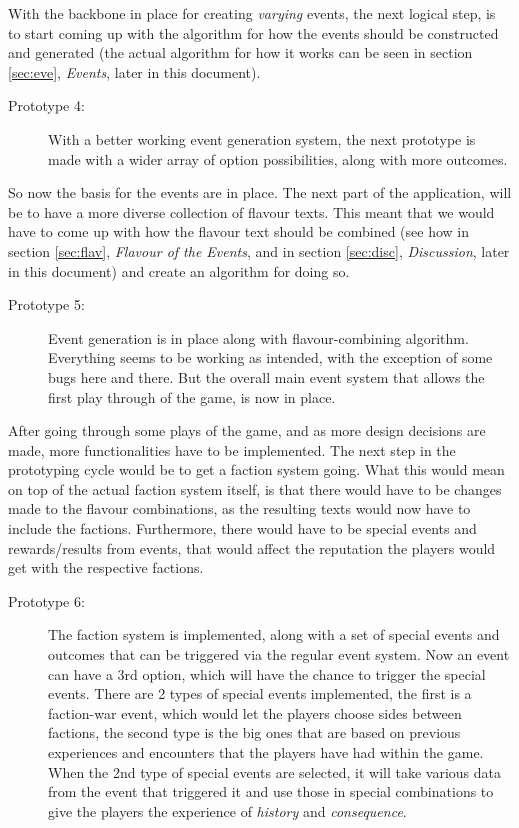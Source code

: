 With the backbone in place for creating \textit{varying} events, the next logical step, is to start coming up with the algorithm for how the events should be constructed and generated (the actual algorithm for how it works can be seen in section \ref{sec:eve}, \textit{Events}, later in this document).

\begin{description}
\item[Prototype 4:] With a better working event generation system, the next prototype is made with a wider array of option possibilities, along with more outcomes.
\end{description}

So now the basis for the events are in place. The next part of the application, will be to have a more diverse collection of flavour texts.
This meant that we would have to come up with how the flavour text should be combined (see how in section \ref{sec:flav}, \textit{Flavour of the Events}, and in section \ref{sec:disc}, \textit{Discussion}, later in this document) and create an algorithm for doing so. 

\begin{description}
\item[Prototype 5:] Event generation is in place along with flavour-combining algorithm. Everything seems to be working as intended, with the exception of some bugs here and there. But the overall main event system that allows the first play through of the game, is now in place.
\end{description}

After going through some plays of the game, and as more design decisions are made, more functionalities have to be implemented. The next step in the prototyping cycle would be to get a faction system going. What this would mean on top of the actual faction system itself, is that there would have to be changes made to the flavour combinations, as the resulting texts would now have to include the factions. Furthermore, there would have to be special events and rewards/results from events, that would affect the reputation the players would get with the respective factions.

\begin{description}
\item[Prototype 6:]
The faction system is implemented, along with a set of special events and outcomes that can be triggered via the regular event system. Now an event can have a 3rd option, which will have the chance to trigger the special events. There are 2 types of special events implemented, the first is a faction-war event, which would let the players choose sides between factions, the second type is the big ones that are based on previous experiences and encounters that the players have had within the game. When the 2nd type of special events are selected, it will take various data from the event that triggered it and use those in special combinations to give the players the experience of \textit{history} and \textit{consequence}.
\end{description}

